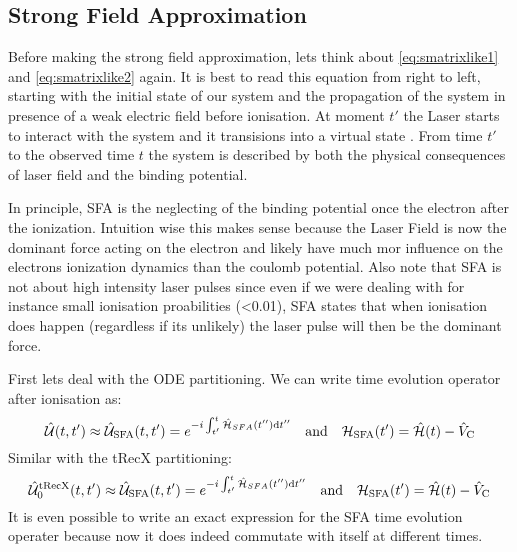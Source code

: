 \subsection{Strong Field Approximation}
Before making the strong field approximation, lets think about \eqref{eq:smatrixlike1} and \eqref{eq:smatrixlike2} again.
It is best to read this equation from right to left, starting with the initial state of our system and the propagation of the system in presence of a weak electric field before ionisation. 
At moment $t'$ the Laser starts to interact with the system and it transisions into a virtual state \cite{Ivanov20012005}. 
From time $t'$ to the observed time $t$ the system is described by both the physical consequences of laser field and the binding potential.

In principle, SFA is the neglecting of the binding potential once the electron after the ionization. 
Intuition wise this makes sense because the Laser Field is now the dominant force acting on the electron and likely have much mor influence on the electrons ionization dynamics than the coulomb potential.
Also note that SFA is not about high intensity laser pulses since even if we were dealing with for instance small ionisation proabilities (<0.01), SFA states that when ionisation does happen (regardless if its unlikely) the laser pulse will then be the dominant force.

First lets deal with the ODE partitioning. 
We can write time evolution operator after ionisation as:
\begin{equation*}
    \hat{\mathcal{U}}(t,t') \approx \hat{\mathcal{U}}_{\mathrm{SFA}}(t,t')=e^{-i \int_{t'}^{t} \hat{\mathcal{H}}_{SFA}(t'') \mathrm{d} t''} \quad \text{and} \quad \mathcal{H}_{\mathrm{SFA}}(t') = \hat{\mathcal{H}}(t) - \hat{V}_{\mathrm{C}}      \label{eq:sfa_formula}
\end{equation*}
Similar with the tRecX partitioning:
\begin{equation*}
    \hat{\mathcal{U}}^{\mathrm{tRecX}}_0(t,t') \approx \hat{\mathcal{U}}_{\mathrm{SFA}}(t,t')=e^{-i \int_{t'}^{t} \hat{\mathcal{H}}_{SFA}(t'') \mathrm{d} t''} \quad \text{and} \quad \mathcal{H}_{\mathrm{SFA}}(t') = \hat{\mathcal{H}}(t) - \hat{V}_{\mathrm{C}}      \label{eq:sfa_formula}
\end{equation*}
It is even possible to write an exact expression for the SFA time evolution operater because now it does indeed commutate with itself at different times.

